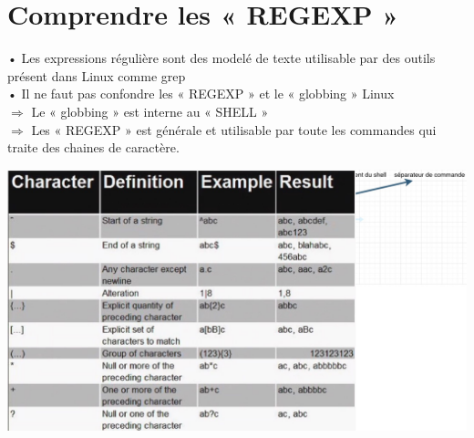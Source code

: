 \documentclass[a4paper, 11pt, french, oneside]{book}
\begin{document}
		\section{Comprendre les « REGEXP »} 
			• Les expressions régulière sont des modelé de texte utilisable	par des outils présent dans Linux comme grep\\
		    • Il ne faut pas confondre les « REGEXP » et le « globbing » Linux\\
			$\Rightarrow$ Le « globbing » est interne au « SHELL »\\
			$\Rightarrow$ Les « REGEXP » est générale et utilisable par toute les commandes qui traite des chaines de caractère.\\
			\begin{flushleft}
				\includegraphics[scale=0.4]{REGEXP.jpg}
			\end{flushleft}
\end{document}
